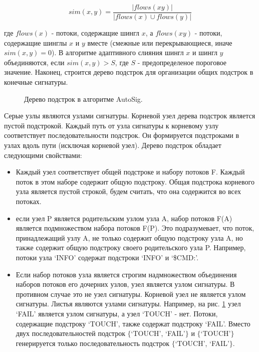 $$ sim(x, y) = \frac{|flows(xy)|}{|flows(x) \cup flows(y)|} $$

где $flows(x)$ - потоки, содержащие шингл $x$, а $flows(xy)$ - потоки, содержащие шинглы $x$ и $y$ вместе (смежные или перекрывающиеся, иначе $sim(x, y) = 0$).
В алгоритме адаптивного слияния шингл $x$ и шингл $y$ объединяются, если $sim(x, y)>S$, где $S$ - предопределеное пороговое значение.
Наконец, строится дерево подстрок для организации общих подстрок в конечные сигнатуры.

\begin{figure}[H]
    \begin{center}
        
        \caption{Дерево подстрок в алгоритме AutoSig.}\label{autosig:tree}
    \end{center}
\end{figure}

Серые узлы являются узлами сигнатуры. Корневой узел дерева подстрок является пустой подстрокой.
Каждый путь от узла сигнатуры к корневому узлу соответствует последовательности подстрок.
Он формируется подстроками в узлах вдоль пути (исключая корневой узел).
Дерево подстрок обладает следующими свойствами:

\begin{itemize}
    \item Каждый узел соответствует общей подстроке и набору потоков F.
    Каждый поток в этом наборе содержит общую подстроку.
    Общая подстрока корневого узла является пустой строкой, будем считать, что она содержится во всех потоках.
    \item если узел P является родительским узлом узла A, набор потоков F(A) является подмножеством набора потоков F(P).
    Это подразумевает, что поток, принадлежащий узлу A, не только содержит общую подстроку узла A, но также содержит общую подстроку своего родительского узла P.
    Например, потоки узла `INFO' содержат подстроки `INFO' и `\$CMD:'.
    \item Если набор потоков узла является строгим надмножеством объединения наборов потоков его дочерних узлов, узел является узлом сигнатуры.
    В противном случае это не узел сигнатуры. Корневой узел не является узлом сигнатуры. Листья являются узлами сигнатуры.
    Например, на рис. \ref{autosig:tree} узел `FAIL' является узлом сигнатуры, а узел `TOUCH' - нет.
    Потоки, содержащие подстроку `TOUCH', также содержат подстроку `FAIL'.
    Вместо двух последовательностей подстрок $\{$`TOUCH', `FAIL'$\}$ и $\{$`TOUCH'$\}$
    генерируется только последовательность подстрок $\{$`TOUCH', `FAIL'$\}$.

\end{itemize}

